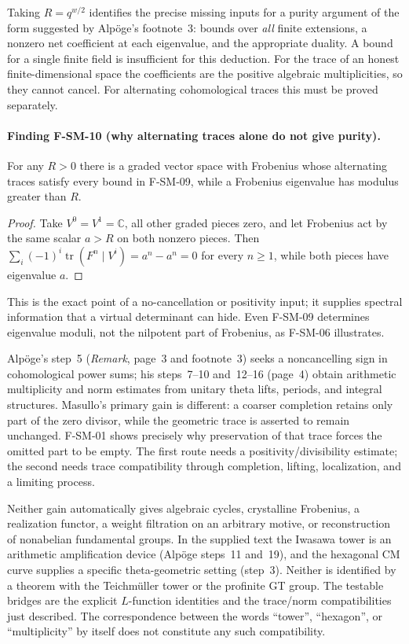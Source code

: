 \documentclass[11pt,a4paper]{article}
\theoremstyle{definition}\newtheorem{definition}[theorem]{Definition}
\theoremstyle{remark}\newtheorem{remark}[theorem]{Remark}
\begin{document}
Taking $R=q^{w/2}$ identifies the precise missing inputs for a purity
argument of the form suggested by Alp\"oge's footnote~3: bounds over
\emph{all} finite extensions, a nonzero net coefficient at each eigenvalue,
and the appropriate duality.  A bound for a single finite field is
insufficient for this deduction.  For the trace of an honest finite-dimensional
space the coefficients are the positive algebraic multiplicities, so
they cannot cancel.  For alternating cohomological traces this must
be proved separately.

\paragraph{Finding F-SM-10 (why alternating traces alone do not give purity).}
For any $R>0$ there is a graded vector space with Frobenius whose
alternating traces satisfy every bound in F-SM-09, while a Frobenius
eigenvalue has modulus greater than $R$.

\begin{proof}
Take $V^0=V^1=\mathbb C$, all other graded pieces zero, and let
Frobenius act by the same scalar $a>R$ on both nonzero pieces.
Then $\sum_i(-1)^i\operatorname{tr}(F^n\mid V^i)=a^n-a^n=0$
for every $n\geq1$, while both pieces have eigenvalue $a$.
\end{proof}

This is the exact point of a no-cancellation or positivity input;
it supplies spectral information that a virtual determinant can hide.
Even F-SM-09 determines eigenvalue moduli, not the nilpotent part of
Frobenius, as F-SM-06 illustrates.

Alp\"oge's step~5 (\emph{Remark}, page~3 and footnote~3) seeks a
noncancelling sign in cohomological power sums; his steps~7--10 and~12--16
(page~4) obtain arithmetic multiplicity and norm estimates from unitary
theta lifts, periods, and integral structures.  Masullo's primary gain is
different: a coarser completion retains only part of the zero divisor,
while the geometric trace is asserted to remain unchanged.  F-SM-01
shows precisely why preservation of that trace forces the omitted part
to be empty.  The first route needs a positivity/divisibility estimate;
the second needs trace compatibility through completion, lifting,
localization, and a limiting process.

Neither gain automatically gives algebraic cycles, crystalline
Frobenius, a realization functor, a weight filtration on an arbitrary
motive, or reconstruction of nonabelian fundamental groups.  In the
supplied text the Iwasawa tower is an arithmetic amplification device
(Alp\"oge steps~11 and~19), and the hexagonal CM curve supplies a
specific theta-geometric setting (step~3).  Neither is identified by a
theorem with the Teichm\"uller tower or the profinite GT group.
The testable bridges are the explicit $L$-function identities and the
trace/norm compatibilities just described.  The correspondence between
the words ``tower'', ``hexagon'', or ``multiplicity'' by itself does not
constitute any such compatibility.
\end{document}
